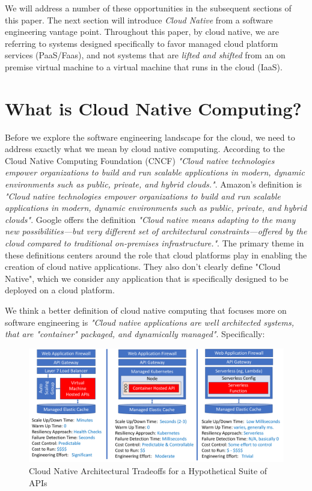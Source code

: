 \documentclass[conference]{IEEEtran}
\begin{document}
We will address a number of these opportunities in the subsequent sections of this paper.  The next section will introduce \textit{Cloud Native} from a software engineering vantage point. Throughout this paper, by cloud native, we are referring to systems designed specifically to favor managed cloud platform services (PaaS/Faas)\cite{albuquerque2017function}, and not systems that are \textit{lifted and shifted}\cite{CloudMigration2017} from an on premise virtual machine to a virtual machine that runs in the cloud (IaaS). 


\section{What is Cloud Native Computing?}
\label{sec:WhatIsCNF}
Before we explore the software engineering landscape for the cloud, we need to address exactly what we mean by cloud native computing.  According to the Cloud Native Computing Foundation (CNCF)\cite{CNCFHome}  \textit{"Cloud native technologies empower organizations to build and run scalable applications in modern, dynamic environments such as public, private, and hybrid clouds."}.  Amazon's definition is \textit{"Cloud native technologies empower organizations to build and run scalable applications in modern, dynamic environments such as public, private, and hybrid clouds"}. Google offers the definition \textit{"Cloud native means adapting to the many new possibilities—but very different set of architectural constraints—offered by the cloud compared to traditional on-premises infrastructure."}.  The primary theme in these definitions centers around the role that cloud platforms play in enabling the creation of cloud native applications.  They also don't clearly define "Cloud Native", which we consider any application that is specifically designed to be deployed on a cloud platform. 

We think a better definition of cloud native computing that focuses more on  software engineering is \textit{"Cloud native applications are well architected systems, that are "container" packaged, and dynamically managed"}. Specifically:

\begin{figure}[t]
	\includegraphics[width=\textwidth]{images/APIPackageTradoffs}	
	\caption{Cloud Native Architectural Tradeoffs for a Hypothetical Suite of APIs}
	\label{fig:CloudQATradeoffs}
\end{figure}
\end{document}
